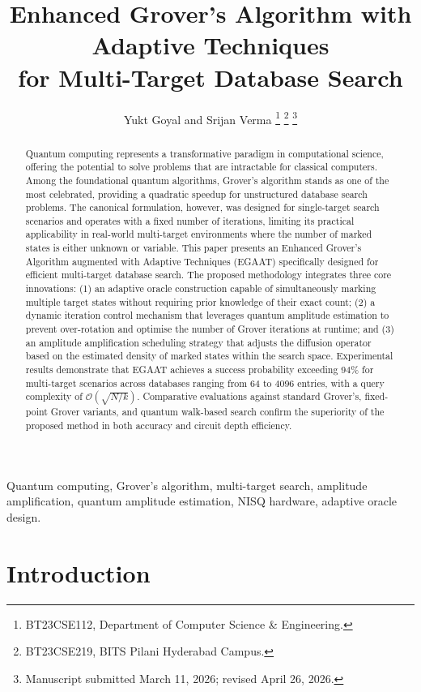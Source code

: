 \documentclass[journal]{IEEEtran}
\title{Enhanced Grover's Algorithm with Adaptive Techniques\\
       for Multi-Target Database Search}
\author{Yukt Goyal and Srijan Verma
\thanks{BT23CSE112, Department of Computer Science \& Engineering.}
\thanks{BT23CSE219, BITS Pilani Hyderabad Campus.}
\thanks{Manuscript submitted March 11, 2026; revised April 26, 2026.}}
\begin{document}
\maketitle

\begin{abstract}
Quantum computing represents a transformative paradigm in computational science, offering the potential to solve problems that are intractable for classical computers. Among the foundational quantum algorithms, Grover's algorithm stands as one of the most celebrated, providing a quadratic speedup for unstructured database search problems. The canonical formulation, however, was designed for single-target search scenarios and operates with a fixed number of iterations, limiting its practical applicability in real-world multi-target environments where the number of marked states is either unknown or variable. This paper presents an Enhanced Grover's Algorithm augmented with Adaptive Techniques (EGAAT) specifically designed for efficient multi-target database search. The proposed methodology integrates three core innovations: (1) an adaptive oracle construction capable of simultaneously marking multiple target states without requiring prior knowledge of their exact count; (2) a dynamic iteration control mechanism that leverages quantum amplitude estimation to prevent over-rotation and optimise the number of Grover iterations at runtime; and (3) an amplitude amplification scheduling strategy that adjusts the diffusion operator based on the estimated density of marked states within the search space. Experimental results demonstrate that EGAAT achieves a success probability exceeding 94\% for multi-target scenarios across databases ranging from 64 to 4096 entries, with a query complexity of $\mathcal{O}(\sqrt{N/k})$. Comparative evaluations against standard Grover's, fixed-point Grover variants, and quantum walk-based search confirm the superiority of the proposed method in both accuracy and circuit depth efficiency.
\end{abstract}

\begin{IEEEkeywords}
Quantum computing, Grover's algorithm, multi-target search, amplitude amplification, quantum amplitude estimation, NISQ hardware, adaptive oracle design.
\end{IEEEkeywords}

\section{Introduction}
\end{document}
